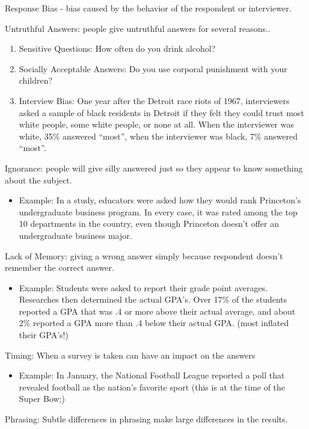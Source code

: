 \documentclass[../stats.tex]{subfiles}
\begin{document}
Response Bias - bias caused by the behavior of the respondent or interviewer.

Untruthful Answers: people give untruthful answers for several reasons..
\begin{enumerate}
    \item Sensitive Questions: How often do you drink alcohol?
    \item Socially Acceptable Answers: Do you use corporal punishment with your children?
    \item Interview Bias: One year after the Detroit race riots of 1967, interviewers asked a sample of black residents in Detroit if they felt they could trust most white people, some white people, or none at all. When the interviewer was white, 35\% answered ``most'', when the interviewer was black, 7\% answered ``most''.
\end{enumerate}

Ignorance: people will give silly answered just so they appear to know something about the subject.
\begin{itemize}
    \item Example: In a study, educators were asked how they would rank Princeton's undergraduate business program. In every case, it was rated among the top 10 departments in the country, even though Princeton doesn't offer an undergraduate business major.
\end{itemize}

Lack of Memory: giving a wrong answer simply because respondent doesn't remember the correct answer.
\begin{itemize}
    \item Example: Students were asked to report their grade point averages. Researches then determined the actual GPA's. Over 17\% of the students reported a GPA that was .4 or more above their actual average, and about 2\% reported a GPA more than .4 below their actual GPA. (most inflated their GPA's!) 
\end{itemize}

Timing: When a survey is taken can have an impact on the answers 
\begin{itemize}
    \item Example: In January, the National Football League reported a poll that revealed football as the nation's favorite sport (this is at the time of the Super Bow;)
\end{itemize}

Phrasing: Subtle differences in phrasing make large differences in the results.
\end{document}
